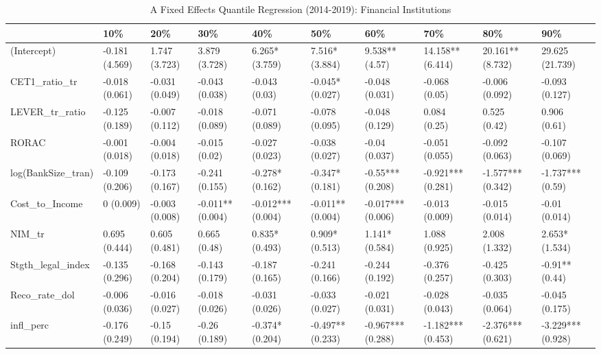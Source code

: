 \begin{table}[ht]
\centering
\caption{A Fixed Effects Quantile Regression (2014-2019): Financial Institutions} 
\begingroup\small
\begin{tabular}{llllllllll}
  \toprule
 & 10\% & 20\% & 30\% & 40\% & 50\% & 60\% & 70\% & 80\% & 90\% \\ 
  \midrule
(Intercept) & -0.181 (4.569) & 1.747 (3.723) & 3.879 (3.728) & 6.265* (3.759) & 7.516* (3.884) & 9.538** (4.57) & 14.158** (6.414) & 20.161** (8.732) & 29.625 (21.739) \\ 
  CET1\_ratio\_tr & -0.018 (0.061) & -0.031 (0.049) & -0.043 (0.038) & -0.043 (0.03) & -0.045* (0.027) & -0.048 (0.031) & -0.068 (0.05) & -0.006 (0.092) & -0.093 (0.127) \\ 
  LEVER\_tr\_ratio & -0.125 (0.189) & -0.007 (0.112) & -0.018 (0.089) & -0.071 (0.089) & -0.078 (0.095) & -0.048 (0.129) & 0.084 (0.25) & 0.525 (0.42) & 0.906 (0.61) \\ 
  RORAC & -0.001 (0.018) & -0.004 (0.018) & -0.015 (0.02) & -0.027 (0.023) & -0.038 (0.027) & -0.04 (0.037) & -0.051 (0.055) & -0.092 (0.063) & -0.107 (0.069) \\ 
  log(BankSize\_tran) & -0.109 (0.206) & -0.173 (0.167) & -0.241 (0.155) & -0.278* (0.162) & -0.347* (0.181) & -0.55*** (0.208) & -0.921*** (0.281) & -1.577*** (0.342) & -1.737*** (0.59) \\ 
  Cost\_to\_Income & 0 (0.009) & -0.003 (0.008) & -0.011** (0.004) & -0.012*** (0.004) & -0.011** (0.004) & -0.017*** (0.006) & -0.013 (0.009) & -0.015 (0.014) & -0.01 (0.014) \\ 
  NIM\_tr & 0.695 (0.444) & 0.605 (0.481) & 0.665 (0.48) & 0.835* (0.493) & 0.909* (0.513) & 1.141* (0.584) & 1.088 (0.925) & 2.008 (1.332) & 2.653* (1.534) \\ 
  Stgth\_legal\_index & -0.135 (0.296) & -0.168 (0.204) & -0.143 (0.179) & -0.187 (0.165) & -0.241 (0.166) & -0.244 (0.192) & -0.376 (0.257) & -0.425 (0.303) & -0.91** (0.44) \\ 
  Reco\_rate\_dol & -0.006 (0.036) & -0.016 (0.027) & -0.018 (0.026) & -0.031 (0.026) & -0.033 (0.027) & -0.021 (0.031) & -0.028 (0.043) & -0.035 (0.064) & -0.045 (0.175) \\ 
  infl\_perc & -0.176 (0.249) & -0.15 (0.194) & -0.26 (0.189) & -0.374* (0.204) & -0.497** (0.233) & -0.967*** (0.288) & -1.182*** (0.453) & -2.376*** (0.621) & -3.229*** (0.928) \\ 

\end{tabular}
\end{table}
